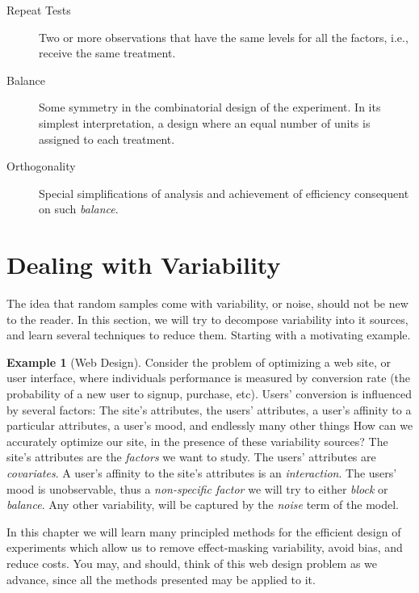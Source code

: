 \documentclass[12pt,a4paper]{report}
\theoremstyle{plain}
\theoremstyle{definition}
\newtheorem{example}{Example}
\begin{document}
\begin{description}
\item [Repeat Tests] Two or more observations that have the same levels for all the factors, i.e., receive the same treatment.

\item [Balance] Some symmetry in the combinatorial design of the experiment. In its simplest interpretation, a design where an equal number of units is assigned to each treatment.

\item [Orthogonality]  Special simplifications of analysis and achievement of efficiency consequent on such \emph{balance}.
\end{description}








\section{Dealing with Variability}
\label{sec:variance_components}

The idea that random samples come with variability, or noise, should not be new to the reader.
In this section, we will try to decompose variability into it sources, and learn several techniques to reduce them. 
Starting with a motivating example.



\begin{example}[Web Design]
\label{eg:variance_components}
Consider the problem of optimizing a web site, or user interface, where individuals performance is measured by conversion rate (the probability of a new user to signup, purchase, etc).
Users' conversion is influenced by several factors:
The site's attributes,
the users' attributes, 
a user's affinity to a particular attributes,  
a user's mood, 
and endlessly many other things
How can we accurately optimize our site, in the presence of these variability sources?
The site's attributes are the \emph{factors} we want to study.
The users' attributes are \emph{covariates}. 
A user's affinity to the site's attributes is an \emph{interaction}. 
The users' mood is unobservable, thus a \emph{non-specific factor} we will try to either \emph{block} or \emph{balance}.
Any other variability, will be captured by the \emph{noise} term of the model. 
\end{example}


In this chapter we will learn many principled methods for the efficient design of experiments which allow us to remove effect-masking variability, avoid bias, and reduce costs.
You may, and should, think of this web design problem as we advance, since all the methods presented may be applied to it.
\end{document}
